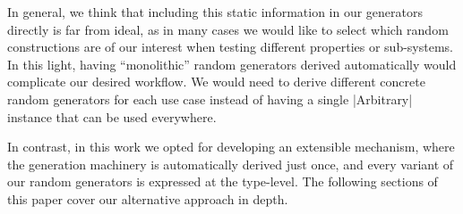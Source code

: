 %
In general, we think that including this static information in our generators
directly is far from ideal, as in many cases we would like to select which
random constructions are of our interest when testing different properties or
sub-systems.
%
In this light, having ``monolithic'' random generators derived automatically
would complicate our desired workflow.
%
We would need to derive different concrete random generators for each use case
instead of having a single |Arbitrary| instance that can be used everywhere.


In contrast, in this work we opted for developing an extensible mechanism, where
the generation machinery is automatically derived just once, and every variant
of our random generators is expressed at the type-level.
%
The following sections of this paper cover our alternative approach in depth.
